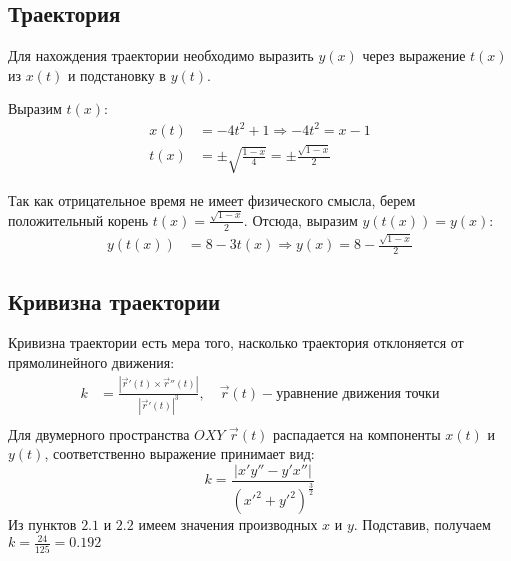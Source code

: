 \subsection{Траектория}
Для нахождения траектории необходимо выразить $y(x)$ через
выражение $t(x)$ из $x(t)$ и подстановку в $y(t)$.

Выразим $t(x)$:\\
\begin{align}
    x(t) &= -4t^{2} + 1 \Rightarrow -4t^{2} = x - 1 \\
    t(x) &= \pm\sqrt{\frac{1-x}{4}} = \pm\frac{\sqrt{1 - x}}{2}
\end{align}

Так как отрицательное время не имеет физического смысла, берем
положительный корень $t(x) = \frac{\sqrt{1 - x}}{2}$.
Отсюда, выразим $y(t(x)) = y(x)$:\\
\begin{align}
    y(t(x)) &= 8 - 3t(x) \Rightarrow
    y(x) = 8 - \frac{\sqrt{1 - x}}{2}
\end{align}

\begin{figure}[ht]
    \centering
\end{figure}

\subsection{Кривизна траектории}
Кривизна траектории есть мера того, насколько траектория отклоняется от
прямолинейного движения:
\begin{align}
    k &= \frac{\left|\vec{r}'(t)\times\vec{r}''(t)\right|}{\left|\vec{r}'(t)\right|^{3}},
    \quad\vec{r}(t) - \text{уравнение движения точки}\\
\end{align}
Для двумерного пространства $OXY$ $\vec{r}(t)$ распадается на компоненты $x(t)$ и $y(t)$,
соответственно выражение принимает вид:
$$k = \frac{\left|x'y'' - y'x''\right|}{(x'^{2}+y'^{2})^{\frac{3}{2}}}$$
Из пунктов $2.1$ и $2.2$ имеем значения производных $x$ и $y$.
Подставив, получаем $k = \frac{24}{125} = 0.192$
